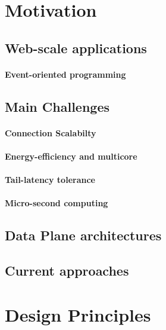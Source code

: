 


\section{Motivation}

\subsection{Web-scale applications}

\paragraph{Event-oriented programming}

\subsection{Main Challenges}

\paragraph{Connection Scalabilty}

\paragraph{Energy-efficiency and multicore}

\paragraph{Tail-latency tolerance}

\paragraph{Micro-second computing}

\subsection{Data Plane architectures}

\subsection{Current approaches}


\section{Design Principles}

